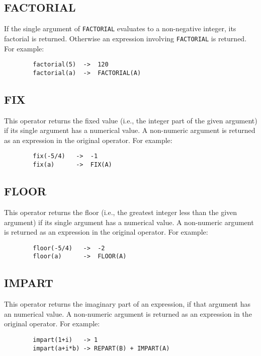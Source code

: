 \subsection{FACTORIAL} 

If the single argument of {\tt FACTORIAL} evaluates to a non-negative
integer, its factorial is returned.  Otherwise an expression involving
{\tt FACTORIAL} is returned. For example:
\begin{verbatim}
        factorial(5)  ->  120
        factorial(a)  ->  FACTORIAL(A)
\end{verbatim}

\subsection{FIX} 
This operator returns the fixed value (i.e., the integer part of
the given argument) if its single argument has a numerical value.  A
non-numeric argument is returned as an expression in the original
operator.  For example:

\begin{verbatim}
        fix(-5/4)   ->  -1
        fix(a)      ->  FIX(A)
\end{verbatim}

\subsection{FLOOR} 
This operator returns the floor (i.e., the greatest integer less than
the given argument) if its single argument has a numerical value.  A
non-numeric argument is returned as an expression in the original
operator.  For example:

\begin{verbatim}
        floor(-5/4)   ->  -2
        floor(a)      ->  FLOOR(A)
\end{verbatim}

\subsection{IMPART} 
This operator returns the imaginary part of an expression, if that argument
has an numerical value.  A non-numeric argument is returned as an expression
in the original operator.  For example:
\begin{verbatim}
        impart(1+i)   -> 1
        impart(a+i*b) -> REPART(B) + IMPART(A)
\end{verbatim}

